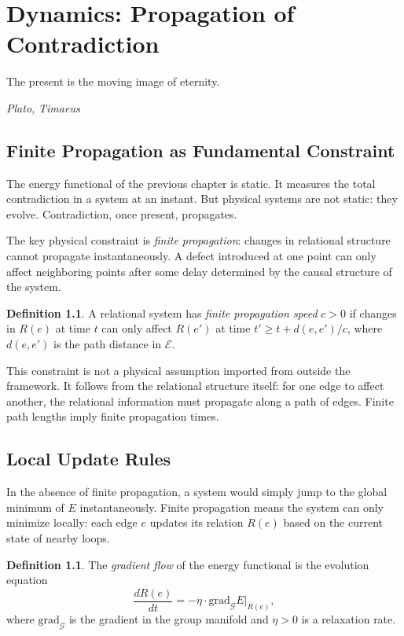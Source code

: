\documentclass[12pt,a4paper,openany]{book}
\theoremstyle{plain}
\theoremstyle{definition}
\newtheorem{definition}[theorem]{Definition}
\theoremstyle{remark}
\newcommand{\GG}{\mathcal{G}}
\newcommand{\EE}{\mathcal{E}}
\newcommand{\Energy}{E}
\begin{document}
\chapter{Dynamics: Propagation of Contradiction}

\epigraph{%
  The present is the moving image of eternity.
}{%
  \textit{Plato,} \textit{Timaeus}}

\section{Finite Propagation as Fundamental Constraint}

The energy functional of the previous chapter is static. It measures the total contradiction in a system at an instant. But physical systems are not static: they evolve. Contradiction, once present, propagates.

The key physical constraint is \emph{finite propagation}: changes in relational structure cannot propagate instantaneously. A defect introduced at one point can only affect neighboring points after some delay determined by the causal structure of the system.

\begin{definition}
A relational system has \emph{finite propagation speed} $c > 0$ if changes in $R(e)$ at time $t$ can only affect $R(e')$ at time $t' \geq t + d(e, e')/c$, where $d(e, e')$ is the path distance in $\EE$.
\end{definition}

This constraint is not a physical assumption imported from outside the framework. It follows from the relational structure itself: for one edge to affect another, the relational information must propagate along a path of edges. Finite path lengths imply finite propagation times.

\section{Local Update Rules}

In the absence of finite propagation, a system would simply jump to the global minimum of $\Energy$ instantaneously. Finite propagation means the system can only minimize locally: each edge $e$ updates its relation $R(e)$ based on the current state of nearby loops.

\begin{definition}
The \emph{gradient flow} of the energy functional is the evolution equation
\[
\frac{dR(e)}{dt} = -\eta \cdot \text{grad}_{\GG} \Energy\big|_{R(e)},
\]
where $\text{grad}_\GG$ is the gradient in the group manifold and $\eta > 0$ is a relaxation rate.
\end{definition}
\end{document}
